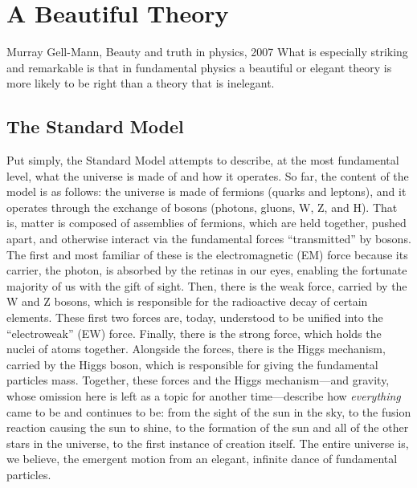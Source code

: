 \chapter{A Beautiful Theory}
\begin{aquote}{Murray Gell-Mann, Beauty and truth in physics, 2007}
    What is especially striking and remarkable is that in fundamental physics 
    a beautiful or elegant theory is more likely to be right 
    than a theory that is inelegant.
\end{aquote}

\section{The Standard Model}
Put simply, the Standard Model attempts to describe, at the most fundamental level, what the universe is made of and how it operates. 
So far, the content of the model is as follows: the universe is made of fermions (quarks and leptons), and it operates through the exchange of bosons (photons, gluons, W, Z, and H). 
That is, matter\footnotemark{} is composed of assemblies of fermions, which are held together, pushed apart, and otherwise interact via the fundamental forces ``transmitted'' by bosons. 
The first and most familiar of these is the electromagnetic (EM) force because its carrier, the photon, is absorbed by the retinas in our eyes, enabling the fortunate majority of us with the gift of sight. 
Then, there is the weak force, carried by the W and Z bosons, which is responsible for the radioactive decay of certain elements. 
These first two forces are, today, understood to be unified into the ``electroweak'' (EW) force. 
Finally, there is the strong force, which holds the nuclei of atoms together. 
Alongside the forces, there is the Higgs mechanism, carried by the Higgs boson, which is responsible for giving the fundamental particles mass. 
Together, these forces and the Higgs mechanism---and gravity, whose omission here is left as a topic for another time---describe how \textit{everything} came to be and continues to be: from the sight of the sun in the sky, to the fusion reaction causing the sun to shine, to the formation of the sun and all of the other stars in the universe, to the first instance of creation itself. 
The entire universe is, we believe, the emergent motion from an elegant, infinite dance of fundamental particles. 

